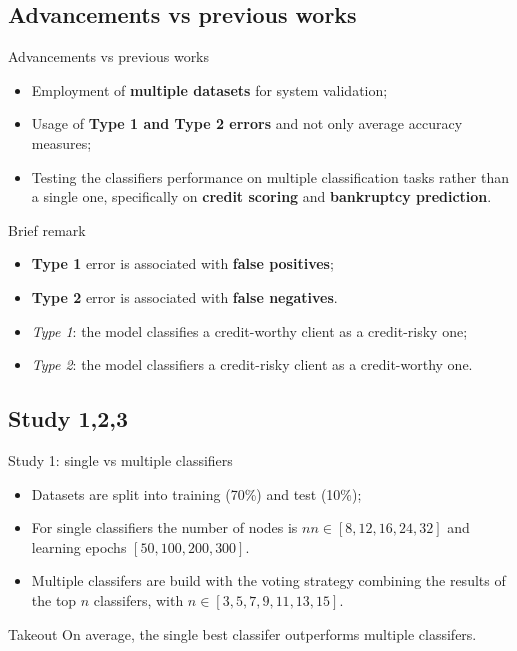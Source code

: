 \documentclass[12pt]{beamer}
\begin{document}
\subsection{Advancements vs previous works}

\begin{frame}{Advancements vs previous works}
  \begin{itemize}
    \item Employment of \textbf{multiple datasets} for system validation;
    \item Usage of \textbf{Type 1 and Type 2 errors} and not only average accuracy measures;
    \item Testing the classifiers performance on multiple classification tasks
      rather than a single one, specifically on \textbf{credit scoring} and \textbf{bankruptcy prediction}.
  \end{itemize}
\end{frame}

\begin{frame}{Brief remark}
\begin{itemize}
\item \textbf{Type 1} error is associated with \textbf{false positives};
\item \textbf{Type 2} error is associated with \textbf{false negatives}.
\end{itemize}

\begin{examples}
  \begin{itemize}
    \item \textit{Type 1}: the model classifies a credit-worthy client as a credit-risky one;
    \item \textit{Type 2}: the model classifiers a credit-risky client as a credit-worthy one.
  \end{itemize}
\end{examples}

\end{frame}

\subsection{Study 1,2,3}

\begin{frame}{Study 1: single vs multiple classifiers}
  \begin{itemize}
    \item Datasets are split into training (70\%) and test (10\%);
    \item For single classifiers the number of nodes is $nn \in [8,12,16,24,32]$
      and learning epochs $[50,100,200,300]$.
    \item Multiple classifers are build with the voting strategy combining the results
      of the top $n$ classifers, with $n \in [3,5,7,9,11,13,15]$.
  \end{itemize}
  \begin{block}{Takeout}
  On average, the single best classifer outperforms multiple classifers.
  \end{block}
\end{frame}
\end{document}
